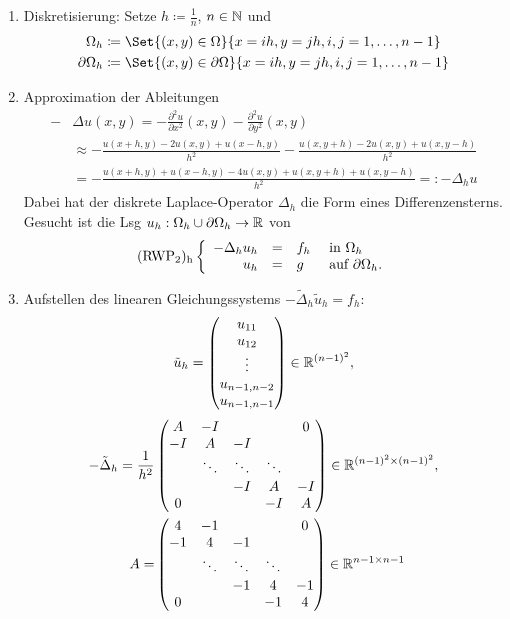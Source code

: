 \documentclass{cheat-sheet}
\newcommand{\bOmega}{\partial \Omega} %
\newcommand{\Laplace}{\Delta}
\newcommand{\tss}[1]{\textsubscript{#1}} %
\begin{document}
\begin{enumerate}
  \item Diskretisierung: Setze $h \coloneqq \tfrac{1}{n}$, $n \in \mathbb{N}$ und
  \begin{align*}
    \Omega_h & \coloneqq \Set{(x, y) \in \Omega}{x = ih, y = jh, i,j = 1, \ldots, {n-1}} \\
    \partial \Omega_h & \coloneqq \Set{(x, y) \in \bOmega}{x = ih, y = jh, i,j = 1, \ldots, {n-1}}
  \end{align*}
  \item Approximation der Ableitungen
  \begin{align*}
  - & \Laplace u (x, y)
  = - \tfrac{\partial^2 u}{\partial x^2} (x,y) - \tfrac{\partial^2 u}{\partial y^2} (x, y) \\
  &\approx - \tfrac{u(x + h, y) - 2 u(x, y) + u(x-h, y)}{h^2} - \tfrac{u(x, y+h) - 2 u(x,y) + u(x, y-h)}{h^2} \\
  &= - \tfrac{u(x+h,y) + u(x-h,y) - 4 u(x, y) + u(x, y+h) + u(x, y-h)}{h^2} =: - \Laplace_h u
  \end{align*}
  Dabei hat der diskrete Laplace-Operator $\Laplace_h$ die Form eines Differenzensterns.
  Gesucht ist die Lsg $u_h : \Omega_h \cup \partial \Omega_h \to \mathbb{R}$ von
  \[
    \text{(RWP\tss{2})\tss{h}} \left\{ \begin{array}{rlll}
      - \Laplace_h u_h &=& f_h &\text{ in $\Omega_h$} \\
      u_h &=& g &\text{ auf $\bOmega_h$.}
    \end{array} \right.
  \]
  \item Aufstellen des linearen Gleichungssystems $- \tilde{\Laplace}_h \tilde{u}_h = f_h$:
  \[
    \tilde{u}_h = \begin{pmatrix}
      u_{11} \\
      u_{12} \\
      \vdots \\
      u_{n-1,n-2} \\
      u_{n-1,n-1}
    \end{pmatrix} \in \mathbb{R}^{(n-1)^2},
  \]
  \begin{align*}
    - \tilde{\Laplace}_h = \frac{1}{h^2} & \begin{pmatrix}
      A & -I & && 0 \\
      -I & A & -I && \\
      & \ddots & \ddots & \ddots \\
      && -I & A & -I \\
      0 &&& -I & A
    \end{pmatrix} \in \R^{(n-1)^2 \times (n-1)^2}, \\
    A = & \begin{pmatrix}
      4 & -1 & && 0 \\
      -1 & 4 & -1 && \\
      & \ddots & \ddots & \ddots \\
      && -1 & 4 & -1 \\
      0 &&& -1 & 4
    \end{pmatrix} \in \R^{n-1 \times n-1}
  \end{align*}
\end{enumerate}
\end{document}
